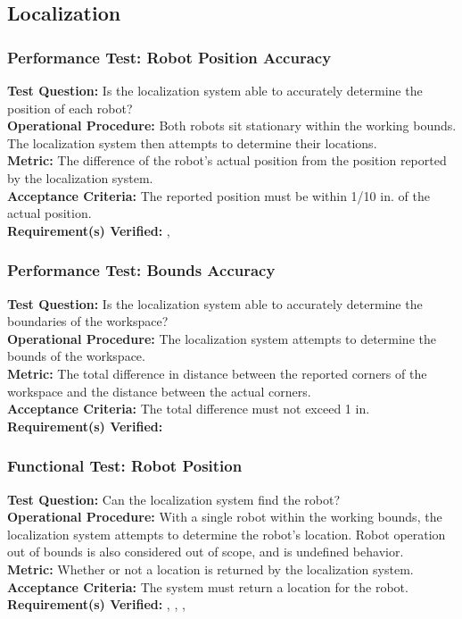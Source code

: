 
\subsection{Localization}
\label{sec:verification_localization}

\subsubsection{Performance Test: Robot Position Accuracy}
\label{test:localization_pt_accuracy}
\textbf{Test Question:} Is the localization system able to accurately determine the position of each robot?\\
\textbf{Operational Procedure:} Both robots sit stationary within the working bounds. The localization system then attempts to determine their locations.\\
\textbf{Metric:} The difference of the robot's actual position from the position reported by the localization system. \\
\textbf{Acceptance Criteria:} The reported position must be within 1/10 in. of the actual position.\\
\textbf{Requirement(s) Verified:} , 

\subsubsection{Performance Test: Bounds Accuracy}
\label{test:localization_pt_bounds}
\textbf{Test Question:} Is the localization system able to accurately determine the boundaries of the workspace?\\
\textbf{Operational Procedure:} The localization system attempts to determine the bounds of the workspace.\\
\textbf{Metric:} The total difference in distance between the reported corners of the workspace and the distance between the actual corners.\\
\textbf{Acceptance Criteria:} The total difference must not exceed 1 in.\\
\textbf{Requirement(s) Verified:} 

\subsubsection{Functional Test: Robot Position}
\label{test:localization_ft_robopos}
\textbf{Test Question:} Can the localization system find the robot?\\
\textbf{Operational Procedure:} With a single robot within the working bounds, the localization system attempts to determine the robot's location. Robot operation out of bounds is also considered out of scope, and is undefined behavior.\\
\textbf{Metric:} Whether or not a location is returned by the localization system.\\
\textbf{Acceptance Criteria:} The system must return a location for the robot. \\
\textbf{Requirement(s) Verified:} , , , 

